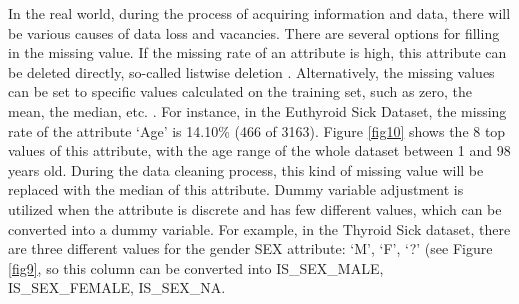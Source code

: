 In the real world, during the process of acquiring information and data, there will be various causes of data loss and vacancies. There are several options for filling in the missing value. If the missing rate of an attribute is high, this attribute can be deleted directly, so-called listwise deletion \cite{84}. Alternatively, the missing values can be set to specific values calculated on the training set, such as zero, the mean, the median, etc. \cite{85}. For instance, in the Euthyroid Sick Dataset, the missing rate of the attribute `Age' is 14.10\% (466 of 3163). Figure \ref{fig10} shows the 8 top values of this attribute, with the age range of the whole dataset between 1 and 98 years old. During the data cleaning process, this kind of missing value will be replaced with the median of this attribute. Dummy variable adjustment \cite{83} is utilized when the attribute is discrete and has few different values, which can be converted into a dummy variable. For example, in the Thyroid Sick dataset, there are three different values for the gender SEX attribute: `M\footnotemark[11]', `F\footnotemark[12]', `?\footnotemark[13]' (see Figure \ref{fig9}, so this column can be converted into IS\_SEX\_MALE, IS\_SEX\_FEMALE, IS\_SEX\_NA.
